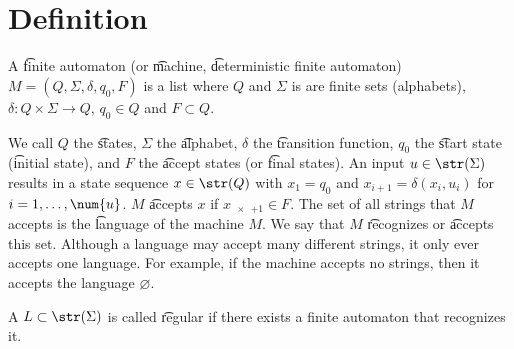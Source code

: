 
\section*{Definition}

A \t{finite automaton} (or \t{machine}, \t{deterministic finite automaton}) $M = (Q, \Sigma , \delta , q_0, F)$ is a list where $Q$ and $\Sigma $ is are finite sets (alphabets), $\delta : Q \times  \Sigma  \to Q$, $q_0 \in Q$ and $F \subset Q$.

We call $Q$ the \t{states}, $\Sigma $ the \t{alphabet}, $\delta $ the \t{transition function}, $q_0$ the \t{start state} (\t{initial state}), and $F$ the \t{accept states} (or \t{final states}).
An input $u \in \str(\Sigma )$ results in a state sequence $x \in \str(Q)$ with $x_1 = q_0$ and $x_{i+1} = \delta (x_i, u_i)$ for $i = 1, \dots , \num{u}$.
$M$ \t{accepts} $x$ if $x_{\num{x}+1} \in F$.
The set of all strings that $M$ accepts is the \t{language} of the machine $M$.
We say that $M$ \t{recognizes} or \t{accepts} this set.
Although a language may accept many different strings, it only ever accepts one language.
For example, if the machine accepts no strings, then it accepts the language $\varnothing$.

A $L \subset \str(\Sigma )$ is called \t{regular} if there exists a finite automaton that recognizes it.

\blankpage